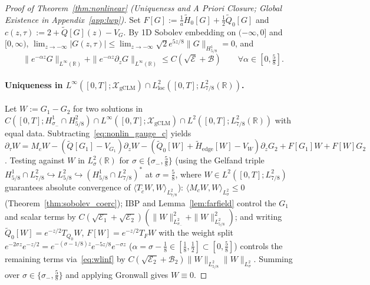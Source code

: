 \documentclass[11pt,a4paper]{article}
\begin{document}
\begin{proof}[Proof of Theorem~\ref{thm:nonlinear} (Uniqueness and \emph{A Priori} Closure; Global Existence in Appendix~\ref{app:lwp})]
Set $F[G] := \frac{1}{a}\widetilde{H}_0[G] + \frac{1}{2}\widetilde{Q}_0[G]$ and $c(z,\tau) := 2 + \widetilde{Q}[G](z) - V_G$. By 1D Sobolev embedding on $(-\infty,0]$ and $[0,\infty)$, $\lim_{z\to-\infty}|G(z,\tau)| \le \lim_{z\to-\infty}\sqrt{2}e^{5z/8}\|G\|_{H^1_{5/8}} = 0$, and
\begin{equation}\label{eq:wlinf}
\|e^{-\alpha z}G\|_{L^\infty(\mathbb{R})} + \|e^{-\alpha z}\partial_z G\|_{L^\infty(\mathbb{R})} \le C(\sqrt{\mathcal{E}} + \mathcal{B}) \qquad \forall \alpha \in [0, \tfrac{5}{8}].
\end{equation}

\paragraph{Uniqueness in $L^\infty([0,T]; \mathcal{X}_{\mathrm{gCLM}}) \cap L^2_{\mathrm{loc}}([0,T]; L^2_{7/8}(\mathbb{R}))$.}
Let $W := G_1 - G_2$ for two solutions in $C([0,T]; H^1_{\sigma_-}\cap H^2_{5/8}) \cap L^\infty([0,T]; \mathcal{X}_{\mathrm{gCLM}}) \cap L^2([0,T]; L^2_{7/8}(\mathbb{R}))$ with equal data. Subtracting~\eqref{eq:nonlin_gauge_c} yields $\partial_\tau W = M_c W - (\widetilde{Q}[G_1] - V_{G_1})\partial_z W - (\widetilde{Q}_0[W] + \widetilde{H}_{\mathrm{edge}}[W] - V_W)\partial_z G_2 + F[G_1]W + F[W]G_2$. Testing against $W$ in $L^2_\sigma(\mathbb{R})$ for $\sigma \in \{\sigma_-, \frac{5}{8}\}$ (using the Gelfand triple $H^1_{5/8}\cap L^2_{7/8} \hookrightarrow L^2_{5/8} \hookrightarrow (H^1_{5/8}\cap L^2_{7/8})^*$ at $\sigma = \frac{5}{8}$, where $W \in L^2([0,T]; L^2_{7/8})$ guarantees absolute convergence of $\langle T_{\tilde c}W, W\rangle_{L^2_{7/8}}$): $\langle M_c W, W\rangle_{L^2_\sigma} \le 0$ (Theorem~\ref{thm:sobolev_coerc}); IBP and Lemma~\ref{lem:farfield} control the $G_1$ and scalar terms by $C(\sqrt{\mathcal{E}_1}+\sqrt{\mathcal{E}_2})(\|W\|_{L^2_{\sigma_-}}^2 + \|W\|_{L^2_{5/8}}^2)$; and writing $\widetilde{Q}_0[W] = e^{-z/2}T_{Q_0}W$, $F[W] = e^{-z/2}T_F W$ with the weight split $e^{-2\sigma z}e^{-z/2} = e^{-(\sigma-1/8)z}e^{-5z/8}e^{-\sigma z}$ ($\alpha = \sigma - \frac{1}{8} \in [\frac{1}{8},\frac{1}{2}] \subset [0,\frac{5}{8}]$) controls the remaining terms via~\eqref{eq:wlinf} by $C(\sqrt{\mathcal{E}_2}+\mathcal{B}_2)\|W\|_{L^2_{5/8}}\|W\|_{L^2_\sigma}$. Summing over $\sigma \in \{\sigma_-, \frac{5}{8}\}$ and applying Gronwall gives $W \equiv 0$.


\end{proof}
\end{document}
